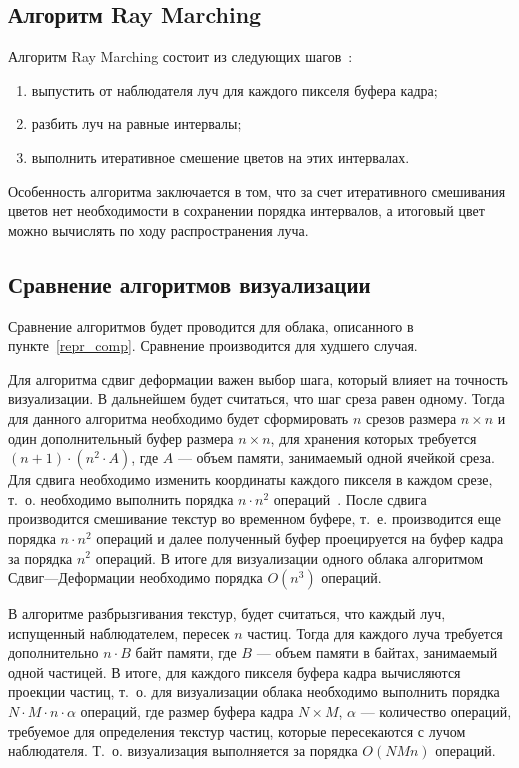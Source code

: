 \subsection{Алгоритм Ray Marching}
\label{ray}

Алгоритм Ray Marching состоит из следующих шагов~\cite{hzd, frostbite, clouds}:
\begin{enumerate}
	\item выпустить от наблюдателя луч для каждого пикселя буфера кадра;
	\item разбить луч на равные интервалы;
	\item выполнить итеративное смешение цветов на этих интервалах.
\end{enumerate}

Особенность алгоритма заключается в том, что за счет итеративного смешивания цветов нет необходимости в сохранении порядка интервалов, а итоговый цвет можно вычислять по ходу распространения луча.

\subsection{Сравнение алгоритмов визуализации}

Сравнение алгоритмов будет проводится для облака, описанного в пункте~\ref{repr_comp}. Сравнение производится для худшего случая.

Для алгоритма сдвиг деформации важен выбор шага, который влияет на точность визуализации. В дальнейшем будет считаться, что шаг среза равен одному. Тогда для данного алгоритма необходимо будет сформировать $n$ срезов размера $n \times n$ и один дополнительный буфер размера $n \times n$, для хранения которых требуется $(n + 1)\cdot(n^2 \cdot A)$, где $A$ --- объем памяти, занимаемый одной ячейкой среза. Для сдвига необходимо изменить координаты каждого пикселя в каждом срезе, т.~о. необходимо выполнить порядка $n \cdot n^2$ операций~\cite{shearwarp}. После сдвига производится смешивание текстур во временном буфере, т.~е. производится еще порядка $n \cdot n^2$ операций и далее полученный буфер проецируется на буфер кадра за порядка $n^2$ операций. В итоге для визуализации одного облака алгоритмом Сдвиг---Деформации необходимо порядка $O(n^3)$ операций.

В алгоритме разбрызгивания текстур, будет считаться, что каждый луч, испущенный наблюдателем, пересек $n$ частиц. Тогда для каждого луча требуется дополнительно $n\cdot B$ байт памяти, где $B$ --- объем памяти в байтах, занимаемый одной частицей. 
В итоге, для каждого пикселя буфера кадра вычисляются проекции частиц, т.~о. для визуализации облака необходимо выполнить порядка $N\cdot M \cdot n \cdot \alpha$ операций, где размер буфера кадра $N \times M$, $\alpha$ --- количество операций, требуемое для определения текстур частиц, которые пересекаются с лучом наблюдателя. Т.~о. визуализация выполняется за порядка $O(NMn)$ операций. 

